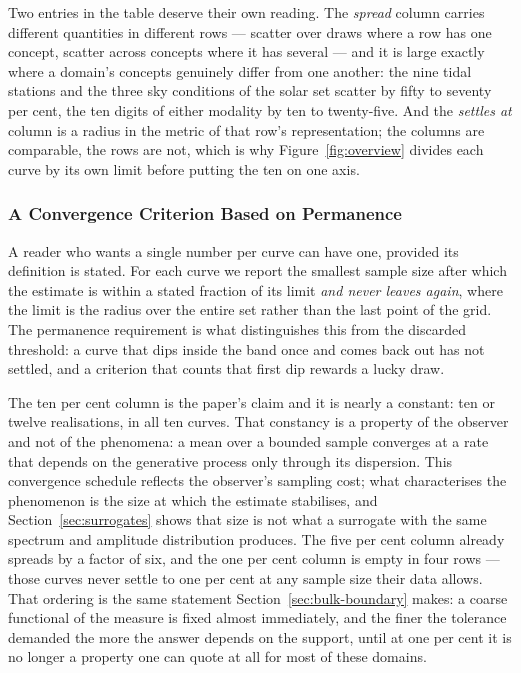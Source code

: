 \documentclass[10pt]{article}
\theoremstyle{plain}
\theoremstyle{definition}
\theoremstyle{remark}
\begin{document}
Two entries in the table deserve their own reading. The \emph{spread} column
carries different quantities in different rows --- scatter over draws where a
row has one concept, scatter across concepts where it has several --- and it is
large exactly where a domain's concepts genuinely differ from one another: the
nine tidal stations and the three sky conditions of the solar set scatter by
fifty to seventy per cent, the ten digits of either modality by ten to
twenty-five. And the \emph{settles at} column is a radius in the metric of that
row's representation; the columns are comparable, the rows are not, which is
why Figure~\ref{fig:overview} divides each curve by its own limit before
putting the ten on one axis.

\subsubsection{A Convergence Criterion Based on Permanence}
\label{sec:crossings}

A reader who wants a single number per curve can have one, provided its
definition is stated. For each curve we report the smallest sample size after
which the estimate is within a stated fraction of its limit \emph{and never
leaves again}, where the limit is the radius over the entire set rather than
the last point of the grid. The permanence requirement is what distinguishes
this from the discarded threshold: a curve that dips inside the band once and
comes back out has not settled, and a criterion that counts that first dip
rewards a lucky draw.

\begin{center}\small

\end{center}

The ten per cent column is the paper's claim and it is nearly a constant: ten
or twelve realisations, in all ten curves. That constancy is a property of the
observer and not of the phenomena: a mean over a bounded sample converges at a
rate that depends on the generative process only through its dispersion. This
convergence schedule reflects the observer's sampling cost; what characterises
the phenomenon is the size at which the estimate stabilises, and Section~\ref{sec:surrogates} shows that size is not what a
surrogate with the same spectrum and amplitude distribution produces. The five per cent column already
spreads by a factor of six, and the one per cent column is empty in four rows
--- those curves never settle to one per cent at any sample size their data
allows. That ordering is the same statement
Section~\ref{sec:bulk-boundary} makes: a coarse functional of the measure is
fixed almost immediately, and the finer the tolerance demanded the more the
answer depends on the support, until at one per cent it is no longer a property
one can quote at all for most of these domains.
\end{document}
